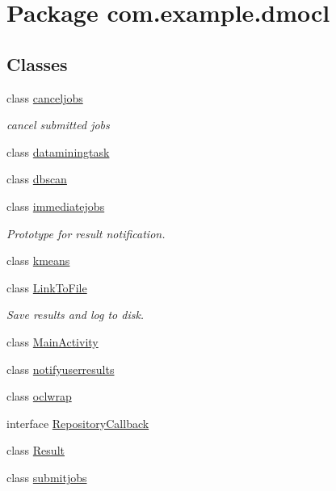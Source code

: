 \hypertarget{namespacecom_1_1example_1_1dmocl}{}\section{Package com.\+example.\+dmocl}
\label{namespacecom_1_1example_1_1dmocl}
\subsection*{Classes}
\begin{DoxyCompactItemize}
\item 
class \mbox{\hyperlink{classcom_1_1example_1_1dmocl_1_1canceljobs}{canceljobs}}
\begin{DoxyCompactList}\small\item\em cancel submitted jobs \end{DoxyCompactList}\item 
class \mbox{\hyperlink{classcom_1_1example_1_1dmocl_1_1dataminingtask}{dataminingtask}}
\item 
class \mbox{\hyperlink{classcom_1_1example_1_1dmocl_1_1dbscan}{dbscan}}
\item 
class \mbox{\hyperlink{classcom_1_1example_1_1dmocl_1_1immediatejobs}{immediatejobs}}
\begin{DoxyCompactList}\small\item\em Prototype for result notification. \end{DoxyCompactList}\item 
class \mbox{\hyperlink{classcom_1_1example_1_1dmocl_1_1kmeans}{kmeans}}
\item 
class \mbox{\hyperlink{classcom_1_1example_1_1dmocl_1_1LinkToFile}{Link\+To\+File}}
\begin{DoxyCompactList}\small\item\em Save results and log to disk. \end{DoxyCompactList}\item 
class \mbox{\hyperlink{classcom_1_1example_1_1dmocl_1_1MainActivity}{Main\+Activity}}
\item 
class \mbox{\hyperlink{classcom_1_1example_1_1dmocl_1_1notifyuserresults}{notifyuserresults}}
\item 
class \mbox{\hyperlink{classcom_1_1example_1_1dmocl_1_1oclwrap}{oclwrap}}
\item 
interface \mbox{\hyperlink{interfacecom_1_1example_1_1dmocl_1_1RepositoryCallback}{Repository\+Callback}}
\item 
class \mbox{\hyperlink{classcom_1_1example_1_1dmocl_1_1Result}{Result}}
\item 
class \mbox{\hyperlink{classcom_1_1example_1_1dmocl_1_1submitjobs}{submitjobs}}
\end{DoxyCompactItemize}

